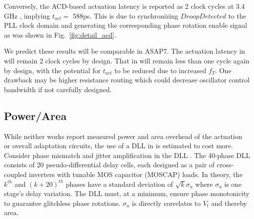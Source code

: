 \documentclass[twoside,9pt,journal,letterpage]{IEEEtran}
\begin{document}
Conversely, the ACD-based actuation latency is reported as 2 clock cycles at 3.4 GHz \cite{wilcox2015}, implying $t_{act} =$ 588ps. This is due to synchronizing $DroopDetected$ to the PLL clock domain  and generating the corresponding phase rotation enable signal as was shown in Fig.\ \ref{fig:detail_acd}.

We predict these results will be comparable in ASAP7. The actuation latency in \cite{wilcox2015} will remain 2 clock cycles by design. That in \cite{hashimoto2018} will remain less than one cycle again by design, with the potential for $t_{act}$ to be reduced due to increased $f_{T}$. One drawback may be higher resistance routing which could decrease oscillator control bandwidth if not carefully designed.

\subsection{Power/Area}
\label{sec:power_area}
While neither works report measured power and area overhead of the actuation or overall adaptation circuits, the use of a DLL in \cite{wilcox2015} is estimated to cost more. Consider phase mismatch and jitter amplification in the DLL \cite{wilcox2015}. The 40-phase DLL consists of 20 pseudo-differential delay cells, each designed as a pair of cross-coupled inverters with tunable MOS capacitor (MOSCAP) loads. In theory, the $k^{th}$ and $(k+20)^{th}$ phases have a standard deviation of $\sqrt{k} \sigma_{u}$ where $\sigma_{u}$ is one stage's delay variation. The DLL must, at a minimum, ensure phase monotonicity to guarantee glitchless phase rotations. $\sigma_{u}$ is directly correlates to $V_{t}$ and thereby area.
\end{document}
